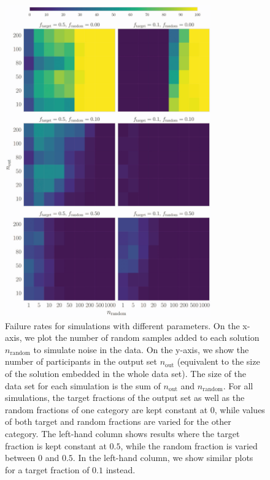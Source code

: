 \documentclass[10pt,letterpaper]{article}
\begin{document}
\begin{figure}[htbp]
\begin{center}
\includegraphics[width=3.5in]{Fig2.eps}
\caption{Failure rates for simulations with different parameters. On the x-axis, we plot the number of random samples added to each solution $n_\mathrm{random}$ to simulate noise in the data. On the y-axis, we show the number of participants in the output set $n_\mathrm{out}$ (equivalent to the size of the solution embedded in the whole data set). The size of the data set for each simulation is the sum of $n_\mathrm{out}$ and $n_\mathrm{random}$. For all simulations, the target fractions of the output set as well as the random fractions of one category are kept constant at $0$, while values of both target and random fractions are varied for the other category. The left-hand column shows results where the target fraction is kept constant at $0.5$, while the random fraction is varied between $0$ and $0.5$. In the left-hand column, we show similar plots for a target fraction of $0.1$ instead.} 
\label{fig:experiments1}
\end{center}
\end{figure}
\end{document}
